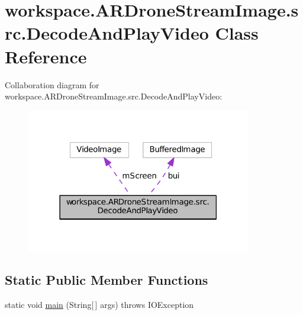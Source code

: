 \hypertarget{classworkspace_1_1_a_r_drone_stream_image_1_1src_1_1_decode_and_play_video}{}\section{workspace.\+A\+R\+Drone\+Stream\+Image.\+src.\+Decode\+And\+Play\+Video Class Reference}
\label{classworkspace_1_1_a_r_drone_stream_image_1_1src_1_1_decode_and_play_video}


Collaboration diagram for workspace.\+A\+R\+Drone\+Stream\+Image.\+src.\+Decode\+And\+Play\+Video\+:\nopagebreak
\begin{figure}[H]
\begin{center}
\leavevmode
\includegraphics[width=278pt]{classworkspace_1_1_a_r_drone_stream_image_1_1src_1_1_decode_and_play_video__coll__graph}
\end{center}
\end{figure}
\subsection*{Static Public Member Functions}
\begin{DoxyCompactItemize}
\item 
static void \hyperlink{classworkspace_1_1_a_r_drone_stream_image_1_1src_1_1_decode_and_play_video_a624f3e1761b2d9490b78c089fab0c447}{main} (String\mbox{[}$\,$\mbox{]} args)  throws I\+O\+Exception 
\end{DoxyCompactItemize}
